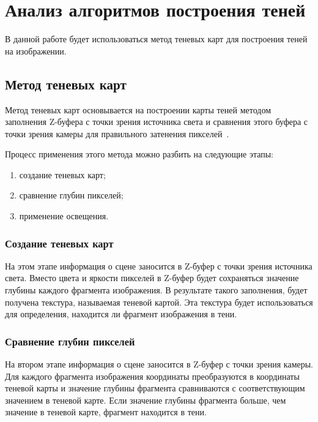 \section{Анализ алгоритмов построения теней}

В данной работе будет использоваться метод теневых карт для построения теней на изображении.

\subsection{Метод теневых карт}

Метод теневых карт основывается на построении карты теней методом заполнения Z-буфера с точки зрения источника света и сравнения этого буфера с точки зрения камеры для правильного затенения пикселей~\cite{Shadows}.

Процесс применения этого метода можно разбить на следующие этапы:

\begin{enumerate}
    \item создание теневых карт;
    \item сравнение глубин пикселей;    
    \item применение освещения.
\end{enumerate}

\subsubsection{Создание теневых карт}

На этом этапе информация о сцене заносится в Z-буфер с точки зрения источника света. Вместо цвета и яркости пикселей в Z-буфер будет сохраняться значение глубины каждого фрагмента изображения. В результате такого заполнения, будет получена текстура, называемая теневой картой. Эта текстура будет использоваться для определения, находится ли фрагмент изображения в тени.

\subsubsection{Сравнение глубин пикселей} 

На втором этапе информация о сцене заносится в Z-буфер с точки зрения камеры. Для каждого фрагмента изображения координаты преобразуются в координаты теневой карты и значение глубины фрагмента сравниваются  с соответствующим значением в теневой карте. 
Если значение глубины фрагмента больше, чем значение в теневой карте, фрагмент находится в тени.

